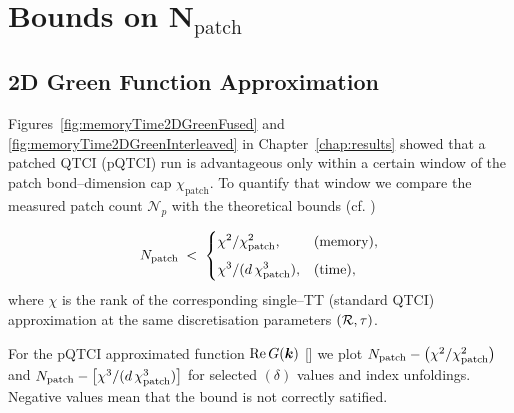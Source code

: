 \chapter{Bounds on \(\mathbf{N}_{\text{patch}}\)}
\label{app:bounds}
\section{2D Green Function Approximation}

Figures~\ref{fig:memoryTime2DGreenFused} and
\ref{fig:memoryTime2DGreenInterleaved} in
Chapter~\ref{chap:results} showed that a patched QTCI (pQTCI) run is advantageous only within a certain window of the patch bond–dimension cap
\(\chi_{\text{patch}}\).   To quantify that window we compare the measured patch count \(\mathcal
N_{\!p}\) with the theoretical bounds (cf. ) 

\begin{equation}
    N_{\text{patch}}
    \;<\;
    \begin{cases}
      \displaystyle\chi^{2}/\chi_{\text{patch}}^{2}, & \text{(memory)},\\[6pt]
      \displaystyle\chi^{3}/(d\,\chi_{\text{patch}}^{3}), & \text{(time)},
    \end{cases}
  \label{eq:chiPatchBoundApp}
\end{equation}
where \(\chi\) is the rank of the corresponding single–TT (standard QTCI)
approximation at the same discretisation parameters \((\mathcal{R},\tau)\).

For the pQTCI approximated function \(\operatorname{Re}G(\boldsymbol{k})\) [] we plot \(N_{\text{patch}}-\bigl(\chi^{2}/\chi_{\text{patch}}^{2}\bigr)\) and
\(N_{\text{patch}}-\bigl[\chi^{3}/(d\,\chi_{\text{patch}}^{3})\bigr]\) for
selected \((\delta)\) values and index unfoldings.   
Negative values mean that the bound is not correctly satified.


